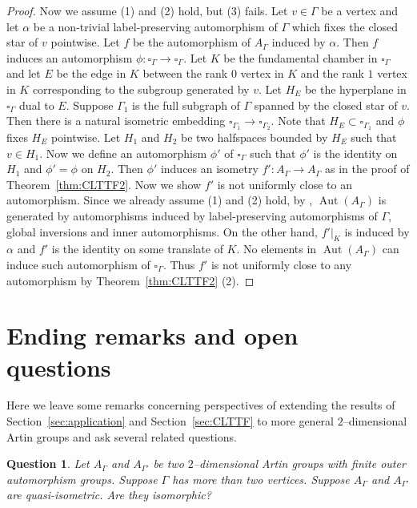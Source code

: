 \documentclass[11pt]{amsart}
\newcommand{\Aut}{\operatorname{Aut}}
\newtheorem{question}[theorem]{Question}
\theoremstyle{definition}
\begin{document}
\begin{proof}
Now we assume (1) and (2) hold, but (3) fails. Let $v\in\Gamma$ be a vertex and let $\alpha$ be a non-trivial label-preserving automorphism of $\Gamma$ which fixes the closed star of $v$ pointwise. Let $f$ be the automorphism of $A_\Gamma$ induced by $\alpha$. Then $f$ induces an automorphism $\phi\colon \square_\Gamma\to \square_\Gamma$. Let $K$ be the fundamental chamber in $\square_\Gamma$ and let $E$ be the edge in $K$ between the rank $0$ vertex in $K$ and the rank $1$ vertex in $K$ corresponding to the subgroup generated by $v$. Let $H_E$ be the hyperplane in $\square_\Gamma$ dual to $E$. Suppose $\Gamma_1$ is the full subgraph of $\Gamma$ spanned by the closed star of $v$. Then there is a natural isometric embedding $\square_{\Gamma_1}\to\square_{\Gamma_2}$. Note that $H_E\subset \square_{\Gamma_1}$ and $\phi$ fixes $H_E$ pointwise. Let $H_1$ and $H_2$ be two halfspaces bounded by $H_E$ such that $v\in H_1$. Now we define an automorphism $\phi'$ of $\square_\Gamma$ such that $\phi'$ is the identity on $H_1$ and $\phi'=\phi$ on $H_2$. Then $\phi'$ induces an isometry $f'\colon A_\Gamma\to A_\Gamma$ as in the proof of Theorem~\ref{thm:CLTTF2}. Now we show $f'$ is not uniformly close to an automorphism. Since we already assume (1) and (2) hold, by \cite[Theorem 1]{MR2174269}, $\Aut(A_\Gamma)$ is generated by automorphisms induced by label-preserving automorphisms of $\Gamma$, global inversions and inner automorphisms. On the other hand, $f'|_K$ is induced by $\alpha$ and $f'$ is the identity on some translate of $K$. No elements in $\Aut(A_\Gamma)$ can induce such automorphism of $\square_\Gamma$. Thus $f'$ is not uniformly close to any automorphism by Theorem~\ref{thm:CLTTF2} (2).
\end{proof}

\section{Ending remarks and open questions}
\label{rmk:ending remark}
Here we leave some remarks concerning perspectives of extending the results of Section~\ref{sec:application} and Section~\ref{sec:CLTTF} to more general $2$--dimensional Artin groups and ask several related questions. 

\begin{question}
	\label{que:1}
	Let $A_\Gamma$ and $A_{\Gamma'}$ be two $2$--dimensional Artin groups with finite outer automorphism groups. Suppose $\Gamma$ has more than two vertices. Suppose $A_\Gamma$ and $A_{\Gamma'}$ are quasi-isometric. Are they isomorphic?
\end{question}
\end{document}
